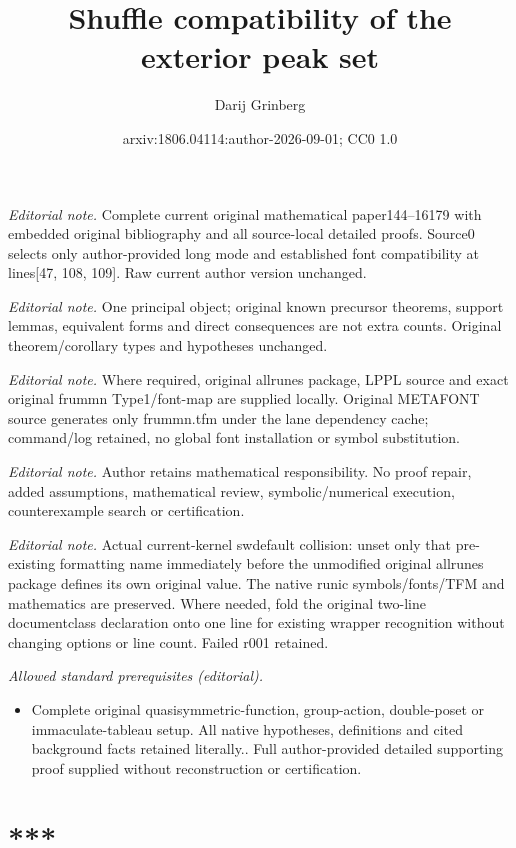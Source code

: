 \documentclass[numbers=enddot,12pt,final,onecolumn,notitlepage]{scrartcl}%
\title{Shuffle compatibility of the exterior peak set}
\author{Darij Grinberg}
\date{arxiv:1806.04114:author-2026-09-01; CC0 1.0}
\theoremstyle{definition}
\begin{document}
\maketitle
\noindent\textit{Editorial note.} Complete current original mathematical paper144--16179 with embedded original bibliography and all source-local detailed proofs. Source0 selects only author-provided long mode and established font compatibility at lines[47, 108, 109]. Raw current author version unchanged.\par\medskip
\noindent\textit{Editorial note.} One principal object; original known precursor theorems, support lemmas, equivalent forms and direct consequences are not extra counts. Original theorem/corollary types and hypotheses unchanged.\par\medskip
\noindent\textit{Editorial note.} Where required, original allrunes package, LPPL source and exact original frummn Type1/font-map are supplied locally. Original METAFONT source generates only frummn.tfm under the lane dependency cache; command/log retained, no global font installation or symbol substitution.\par\medskip
\noindent\textit{Editorial note.} Author retains mathematical responsibility. No proof repair, added assumptions, mathematical review, symbolic/numerical execution, counterexample search or certification.\par\medskip
\noindent\textit{Editorial note.} Actual current-kernel swdefault collision: unset only that pre-existing formatting name immediately before the unmodified original allrunes package defines its own original value. The native runic symbols/fonts/TFM and mathematics are preserved. Where needed, fold the original two-line documentclass declaration onto one line for existing wrapper recognition without changing options or line count. Failed r001 retained.\par\medskip
\noindent\textit{Allowed standard prerequisites (editorial).}\begin{itemize}
\item Complete original quasisymmetric-function, group-action, double-poset or immaculate-tableau setup. All native hypotheses, definitions and cited background facts retained literally.. Full author-provided detailed supporting proof supplied without reconstruction or certification.
\end{itemize}\medskip
\section*{***}
\end{document}
